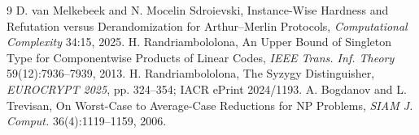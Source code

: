 \documentclass[11pt]{article}
\begin{document}
\begin{thebibliography}{9}
 D. van Melkebeek and N. Mocelin Sdroievski, Instance-Wise Hardness and Refutation versus Derandomization for Arthur--Merlin Protocols, \emph{Computational Complexity} 34:15, 2025.
 H. Randriambololona, An Upper Bound of Singleton Type for Componentwise Products of Linear Codes, \emph{IEEE Trans. Inf. Theory} 59(12):7936--7939, 2013.
 H. Randriambololona, The Syzygy Distinguisher, \emph{EUROCRYPT 2025}, pp. 324--354; IACR ePrint 2024/1193.
 A. Bogdanov and L. Trevisan, On Worst-Case to Average-Case Reductions for NP Problems, \emph{SIAM J. Comput.} 36(4):1119--1159, 2006.
\end{thebibliography}
\end{document}
